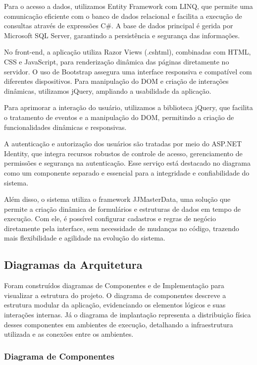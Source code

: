\documentclass[
	12pt,				%
	openany,			%
	twoside,			%
	a4paper,			%
	english,			%
	brazil				%
	]{abntex2}
\begin{document}
Para o acesso a dados, utilizamos Entity Framework com LINQ, que permite uma comunicação eficiente com o banco de dados relacional e facilita a execução de consultas através de expressões C\#. A base de dados principal é gerida por Microsoft SQL Server, garantindo a persistência e segurança das informações.

No front-end, a aplicação utiliza Razor Views (.cshtml), combinadas com HTML, CSS e JavaScript, para renderização dinâmica das páginas diretamente no servidor. O uso de Bootstrap assegura uma interface responsiva e compatível com diferentes dispositivos. Para manipulação do DOM e criação de interações dinâmicas, utilizamos jQuery, ampliando a usabilidade da aplicação.

Para aprimorar a interação do usuário, utilizamos a biblioteca jQuery, que facilita o tratamento de eventos e a manipulação do DOM, permitindo a criação de funcionalidades dinâmicas e responsivas.

A autenticação e autorização dos usuários são tratadas por meio do ASP.NET Identity, que integra recursos robustos de controle de acesso, gerenciamento de permissões e segurança na autenticação. Esse serviço está destacado no diagrama como um componente separado e essencial para a integridade e confiabilidade do sistema.

Além disso, o sistema utiliza o framework JJMasterData, uma solução que permite a criação dinâmica de formulários e estruturas de dados em tempo de execução. Com ele, é possível configurar cadastros e regras de negócio diretamente pela interface, sem necessidade de mudanças no código, trazendo mais flexibilidade e agilidade na evolução do sistema.

\subsection{Diagramas da Arquitetura}

Foram construídos diagramas de Componentes e de Implementação para visualizar a estrutura do projeto. O diagrama de componentes descreve a estrutura modular da aplicação, evidenciando os elementos lógicos e suas interações internas. Já o diagrama de implantação representa a distribuição física desses componentes em ambientes de execução, detalhando a infraestrutura utilizada e as conexões entre os ambientes.

\subsubsection{Diagrama de Componentes}
\end{document}
